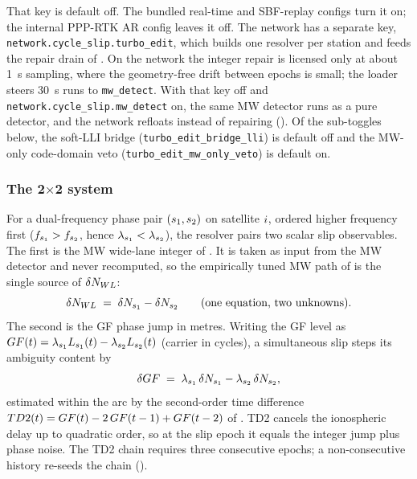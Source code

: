 \documentclass[main.tex]{subfiles}
\begin{document}
That key is default off.  The bundled real-time and SBF-replay configs
turn it on; the internal PPP-RTK AR config leaves it off.  The network
has a separate key, \texttt{network.cycle\_slip.turbo\_edit}, which builds
one resolver per station and feeds the repair drain of
.  On the network the integer repair is licensed
only at about \SI{1}{s} sampling, where the geometry-free drift between
epochs is small; the loader steers 30~s runs to \texttt{mw\_detect}.  With
that key off and
\texttt{network.cycle\_slip.mw\_detect} on, the same MW detector runs as
a pure detector, and the network refloats instead of repairing
().  Of the sub-toggles below, the soft-LLI
bridge (\texttt{turbo\_edit\_bridge\_lli}) is default off and the
MW-only code-domain veto (\texttt{turbo\_edit\_mw\_only\_veto}) is
default on.

\subsubsection{The 2$\times$2 system}\label{sec:slip-te-system}

For a dual-frequency phase pair $(s_1, s_2)$ on satellite
$i$, ordered higher frequency first ($f_{s_1} > f_{s_2}$,
hence $\lambda_{s_1} < \lambda_{s_2}$), the resolver pairs two
scalar slip observables.  The first is the MW wide-lane integer of
.  It is taken as input from the MW detector and
never recomputed, so the empirically tuned MW path of
 is the single source of $\delta N_{WL}$:
\begin{equation}
\delta N_{WL} \;=\; \delta N_{s_1} - \delta N_{s_2}
\qquad\text{(one equation, two unknowns).}
\label{eq:te-mw}
\end{equation}
The second is the GF phase jump in metres.  Writing the GF level as
$GF(t) = \lambda_{s_1} L_{s_1}(t) - \lambda_{s_2}
L_{s_2}(t)$ (carrier in cycles), a simultaneous slip steps its
ambiguity content by
\begin{equation}
\delta GF
\;=\;
\lambda_{s_1}\,\delta N_{s_1} - \lambda_{s_2}\,\delta N_{s_2},
\label{eq:te-gf}
\end{equation}
estimated within the arc by the second-order time difference
$TD2(t) = GF(t) - 2\,GF(t-1) + GF(t-2)$ of
.  TD2 cancels the ionospheric delay up to quadratic
order, so at the slip epoch it equals the integer jump plus phase noise.
The TD2 chain requires three consecutive epochs; a non-consecutive
history re-seeds the chain ().
\end{document}
